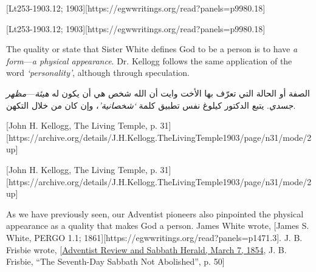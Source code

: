 [Lt253-1903.12; 1903][https://egwwritings.org/read?panels=p9980.18]


[Lt253-1903.12; 1903][https://egwwritings.org/read?panels=p9980.18]


The quality or state that Sister White defines God to be a person is to have \textit{a form}—\textit{a physical appearance}. Dr. Kellogg follows the same application of the word \textit{‘personality’}, although through speculation.


الصفة أو الحالة التي تعرّف بها الأخت وايت أن الله شخص هي أن يكون له \textit{هيئة}—\textit{مظهر جسدي}. يتبع الدكتور كيلوغ نفس تطبيق كلمة \textit{‘شخصانية’}، وإن كان من خلال التكهن.


[John H. Kellogg, The Living Temple, p. 31][https://archive.org/details/J.H.Kellogg.TheLivingTemple1903/page/n31/mode/2up]


[John H. Kellogg, The Living Temple, p. 31][https://archive.org/details/J.H.Kellogg.TheLivingTemple1903/page/n31/mode/2up]


As we have previously seen, our Adventist pioneers also pinpointed the physical appearance as a quality that makes God a person. James White wrote, [James S. White, PERGO 1.1; 1861][https://egwwritings.org/read?panels=p1471.3]. J. B. Frisbie wrote, [\href{https://documents.adventistarchives.org/Periodicals/RH/RH18540307-V05-07.pdf}{Adventist Review and Sabbath Herald, March 7, 1854}, J. B. Frisbie, “The Seventh-Day Sabbath Not Abolished”, p. 50]


